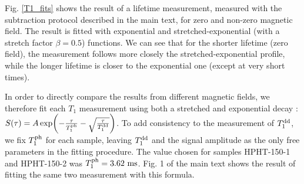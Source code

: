 \documentclass[preprintnumbers,amsmath,amssymb,onecolumn,12pt]{revtex4-2}\usepackage{graphicx}%
\begin{document}
Fig. \ref{T1_fits} shows the result of a lifetime measurement, measured with the subtraction protocol described in the main text, for zero and non-zero magnetic field. The result is fitted with exponential and stretched-exponential (with a stretch factor $\beta=0.5$) functions. We can see that for the shorter lifetime (zero field), the measurement follows more closely the stretched-exponential profile, while the longer lifetime is closer to the exponential one (except at very short times).

In order to directly compare the results from different magnetic fields, we therefore fit each $T_1$ measurement using both a stretched and exponential decay : $S(\tau)=A \exp (-\frac{\tau}{T_1^{\rm ph}} -\sqrt{\frac{\tau}{T_1^{\rm dd}}})$.
To add consistency to the measurement of $T_1^{\rm dd}$, we fix $T_1^{\rm ph}$ for each sample, leaving $T_1^{\rm dd}$ and the signal amplitude as the only free parameters in the fitting procedure. The value chosen for samples HPHT-150-1 and HPHT-150-2 was $T_1^{\rm ph}=3.62\ \rm ms$. Fig. 1 of the main text shows the result of fitting the same two measurement with this formula.
\end{document}
